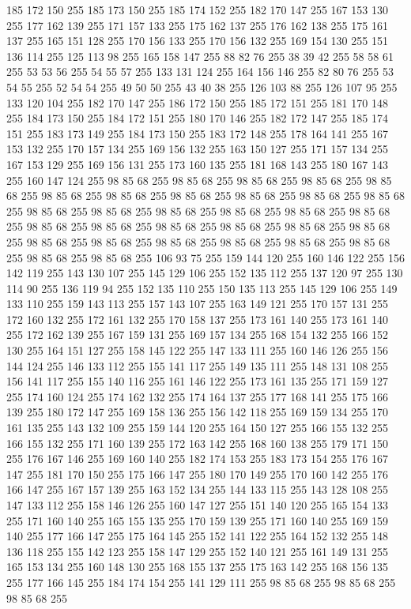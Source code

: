 185 172 150 255 185 173 150 255 185 174 152 255 182 170 147 255 167 153 130 255 177 162 139 255 171 157 133 255 175 162 137 255 176 162 138 255 175 161 137 255 165 151 128 255 170 156 133 255 170 156 132 255 169 154 130 255 151 136 114 255 125 113 98 255 165 158 147 255 88 82 76 255 38 39 42 255 58 58 61 255 53 53 56 255 54 55 57 255 133 131 124 255 164 156 146 255 82 80 76 255 53 54 55 255 52 54 54 255 49 50 50 255 43 40 38 255 126 103 88 255 126 107 95 255 133 120 104 255 182 170 147 255 186 172 150 255 185 172 151 255 181 170 148 255 184 173 150 255 184 172 151 255 180 170 146 255 182 172 147 255 185 174 151 255 183 173 149 255 184 173 150 255 183 172 148 255 178 164 141 255 167 153 132 255 170 157 134 255 169 156 132 255 163 150 127 255 171 157 134 255 167 153 129 255 169 156 131 255 173 160 135 255 181 168 143 255 180 167 143 255 160 147 124 255 98 85 68 255 98 85 68 255 98 85 68 255 98 85 68 255 98 85 68 255 98 85 68 255 98 85 68 255 98 85 68 255
98 85 68 255 98 85 68 255 98 85 68 255 98 85 68 255 98 85 68 255 98 85 68 255 98 85 68 255 98 85 68 255 98 85 68 255 98 85 68 255 98 85 68 255 98 85 68 255 98 85 68 255 98 85 68 255 98 85 68 255 98 85 68 255 98 85 68 255 98 85 68 255 98 85 68 255 98 85 68 255 98 85 68 255 98 85 68 255 98 85 68 255 106 93 75 255 159 144 120 255 160 146 122 255 156 142 119 255 143 130 107 255 145 129 106 255 152 135 112 255 137 120 97 255 130 114 90 255 136 119 94 255 152 135 110 255 150 135 113 255 145 129 106 255 149 133 110 255 159 143 113 255 157 143 107 255 163 149 121 255 170 157 131 255 172 160 132 255 172 161 132 255 170 158 137 255 173 161 140 255 173 161 140 255 172 162 139 255 167 159 131 255 169 157 134 255 168 154 132 255 166 152 130 255 164 151 127 255 158 145 122 255 147 133 111 255 160 146 126 255 156 144 124 255 146 133 112 255 155 141 117 255 149 135 111 255 148 131 108 255 156 141 117 255 155 140 116 255 161 146 122 255 173 161 135 255
171 159 127 255 174 160 124 255 174 162 132 255 174 164 137 255 177 168 141 255 175 166 139 255 180 172 147 255 169 158 136 255 156 142 118 255 169 159 134 255 170 161 135 255 143 132 109 255 159 144 120 255 164 150 127 255 166 155 132 255 166 155 132 255 171 160 139 255 172 163 142 255 168 160 138 255 179 171 150 255 176 167 146 255 169 160 140 255 182 174 153 255 183 173 154 255 176 167 147 255 181 170 150 255 175 166 147 255 180 170 149 255 170 160 142 255 176 166 147 255 167 157 139 255 163 152 134 255 144 133 115 255 143 128 108 255 147 133 112 255 158 146 126 255 160 147 127 255 151 140 120 255 165 154 133 255 171 160 140 255 165 155 135 255 170 159 139 255 171 160 140 255 169 159 140 255 177 166 147 255 175 164 145 255 152 141 122 255 164 152 132 255 148 136 118 255 155 142 123 255 158 147 129 255 152 140 121 255 161 149 131 255 165 153 134 255 160 148 130 255 168 155 137 255 175 163 142 255 168 156 135 255 177 166 145 255 184 174 154 255 141 129 111 255 98 85 68 255 98 85 68 255 98 85 68 255
